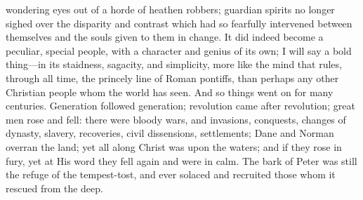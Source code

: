 wondering eyes out of a horde of heathen robbers;
guardian spirits no longer sighed over the disparity and
contrast which had so fearfully intervened between
themselves and the souls given to them in change. It did
indeed become a peculiar, special people, with a
character and genius of its own; I will say a bold
thing—in its staidness, sagacity, and simplicity,
more like the mind that rules, through all time, the
princely line of Roman pontiffs, than perhaps any other
Christian people whom the world has seen. And so things
went on for many centuries. Generation followed
generation; revolution came after revolution; great men
rose and fell: there were bloody wars, and invasions,
conquests, changes of dynasty, slavery, recoveries, civil
dissensions, settlements; Dane and Norman overran the
land; yet all along Christ was upon the waters; and if
they rose in fury, yet at His word they fell again and
were in calm. The bark of Peter was still the refuge of
the tempest-tost, and ever solaced and recruited those
whom it rescued from the deep.

